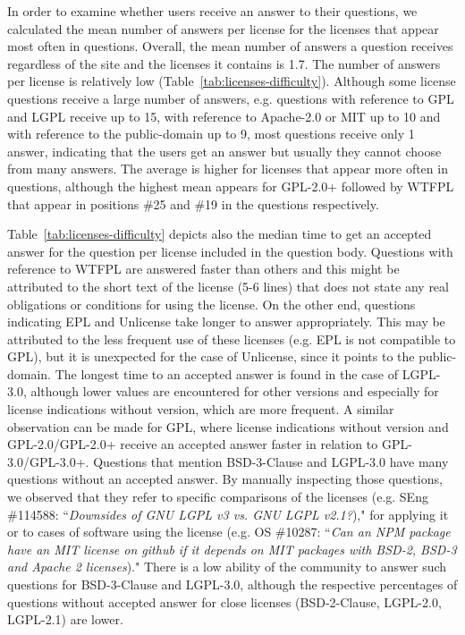 \documentclass{elsarticle}
\begin{document}
In order to examine whether users receive an answer to their questions, we calculated the mean number of answers per license for the licenses that appear most often in questions. Overall, the mean number of answers a question receives regardless of the site and the licenses it contains is 1.7. The number of answers per license is relatively low (Table~\ref{tab:licenses-difficulty}). Although some license questions receive a large number of answers, e.g. questions with reference to GPL and LGPL receive up to 15, with reference to Apache-2.0 or MIT up to 10 and with reference to the public-domain up to 9, most questions receive only 1 answer, indicating that the users get an answer but usually they cannot choose from many answers. The average is higher for licenses that appear more often in questions, although the highest mean appears for GPL-2.0+ followed by WTFPL that appear in positions \#25 and \#19 in the questions respectively. 

Table~\ref{tab:licenses-difficulty} depicts also the median time to get an accepted answer for the question per license included in the question body. Questions with reference to WTFPL are answered faster than  others and this might be attributed to the short text of the license (5-6 lines) that does not state any real obligations or conditions for using the license. On the other end, questions indicating EPL and Unlicense take longer to answer appropriately. This may be attributed to the less frequent use of these licenses (e.g. EPL is not compatible to GPL), but it is unexpected for the case of Unlicense, since it points to the public-domain. The longest time to an accepted answer is found in the case of LGPL-3.0, although lower values are encountered for other versions and especially for license indications without version, which are more frequent. A similar observation can be made for GPL, where license indications without version and GPL-2.0/GPL-2.0+ receive an accepted answer faster in relation to GPL-3.0/GPL-3.0+. Questions that mention BSD-3-Clause and LGPL-3.0 have many questions without an accepted answer. By manually inspecting those questions, we observed that they refer to specific comparisons of the licenses (e.g. SEng \#114588: ``\emph{Downsides of GNU LGPL v3 vs. GNU LGPL v2.1?})," for applying it or to cases of software using the license (e.g. OS \#10287: ``\emph{Can an NPM package have an MIT license on github if it depends on MIT packages with BSD-2, BSD-3 and Apache 2 licenses})." There is a low ability of the community to answer such questions for BSD-3-Clause and LGPL-3.0, although the respective percentages of questions without accepted answer for close licenses (BSD-2-Clause, LGPL-2.0, LGPL-2.1) are lower. 
\end{document}
